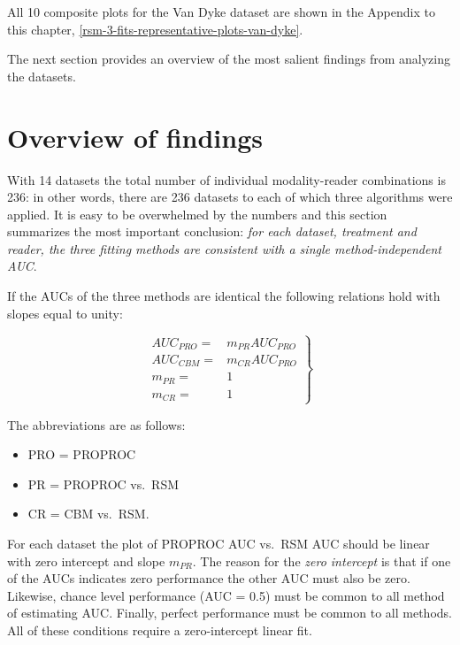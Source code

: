 \documentclass[
]{book}
\providecommand{\tightlist}{%
  \setlength{\itemsep}{0pt}\setlength{\parskip}{0pt}}
\begin{document}
All 10 composite plots for the Van Dyke dataset are shown in the Appendix to this chapter, \ref{rsm-3-fits-representative-plots-van-dyke}.

The next section provides an overview of the most salient findings from analyzing the datasets.

\hypertarget{rsm-3-fits-overview}{%
\section{Overview of findings}\label{rsm-3-fits-overview}}

With 14 datasets the total number of individual modality-reader combinations is 236: in other words, there are 236 datasets to each of which three algorithms were applied. It is easy to be overwhelmed by the numbers and this section summarizes the most important conclusion: \emph{for each dataset, treatment and reader, the three fitting methods are consistent with a single method-independent AUC}.

If the AUCs of the three methods are identical the following relations hold with slopes equal to unity:

\begin{equation}
\left. 
\begin{aligned}
AUC_{PRO} =& m_{PR} AUC_{PRO}  \\
AUC_{CBM} =& m_{CR} AUC_{PRO} \\
m_{PR}    =& 1 \\
m_{CR}    =& 1
\end{aligned}
\right \}
\label{eq:rsm-3-fits-slopes-equation1}
\end{equation}

The abbreviations are as follows:

\begin{itemize}
\tightlist
\item
  PRO = PROPROC
\item
  PR = PROPROC vs.~RSM
\item
  CR = CBM vs.~RSM.
\end{itemize}

For each dataset the plot of PROPROC AUC vs.~RSM AUC should be linear with zero intercept and slope \(m_{PR}\). The reason for the \emph{zero intercept} is that if one of the AUCs indicates zero performance the other AUC must also be zero. Likewise, chance level performance (AUC = 0.5) must be common to all method of estimating AUC. Finally, perfect performance must be common to all methods. All of these conditions require a zero-intercept linear fit.
\end{document}
